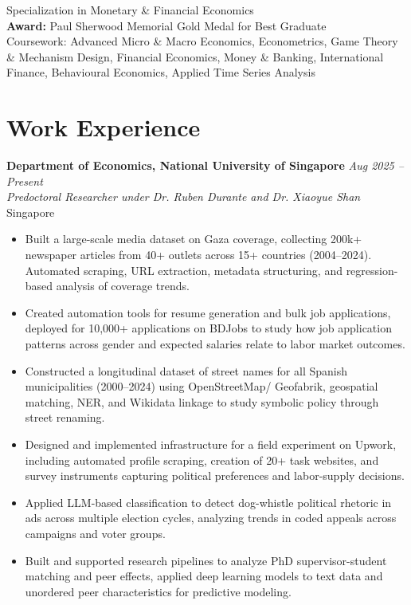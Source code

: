 \documentclass[10pt,a4paper]{article}
\newcommand{\cventry}[4]{%
\textbf{#1} \hfill \textit{#2} \\
\textit{#3} \hfill #4
\vspace{2pt}
}
\begin{document}
Specialization in Monetary \& Financial Economics\\
\textbf{Award:} Paul Sherwood Memorial Gold Medal for Best Graduate\\
Coursework: Advanced Micro \& Macro Economics, Econometrics, Game Theory \& Mechanism Design, Financial Economics, Money \& Banking, International Finance, Behavioural Economics, Applied Time Series Analysis

\section{Work Experience}

\cventry{Department of Economics, National University of Singapore}{Aug 2025 -- Present}{Predoctoral Researcher under Dr. Ruben Durante and Dr. Xiaoyue Shan}{Singapore}
\begin{itemize}
    \item Built a large-scale media dataset on Gaza coverage, collecting 200k+ newspaper articles from 40+ outlets across 15+ countries (2004–2024). Automated scraping, URL extraction, metadata structuring, and regression-based analysis of coverage trends.
    \item Created automation tools for resume generation and bulk job applications, deployed for 10,000+ applications on BDJobs to study how job application patterns across gender and expected salaries relate to labor market outcomes.
    \item Constructed a longitudinal dataset of street names for all Spanish municipalities (2000–2024) using OpenStreetMap/ Geofabrik, geospatial matching, NER, and Wikidata linkage to study symbolic policy through street renaming.
    \item Designed and implemented infrastructure for a field experiment on Upwork, including automated profile scraping, creation of 20+ task websites, and survey instruments capturing political preferences and labor-supply decisions.
    \item Applied LLM-based classification to detect dog-whistle political rhetoric in ads across multiple election cycles, analyzing trends in coded appeals across campaigns and voter groups.
    \item Built and supported research pipelines to analyze PhD supervisor-student matching and peer effects, applied deep learning models to text data and unordered peer characteristics for predictive modeling.
\end{itemize}
\end{document}
